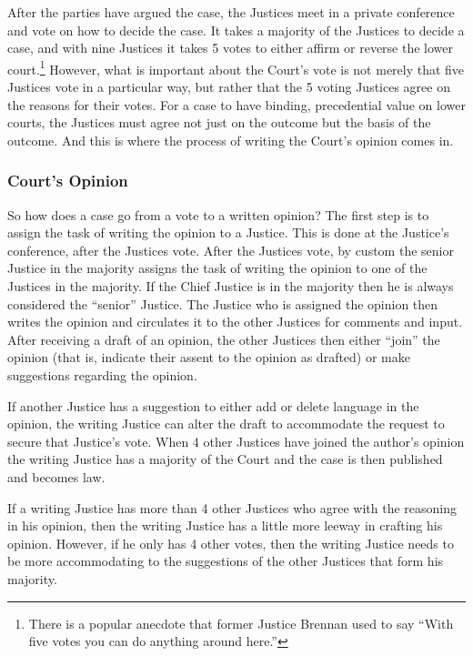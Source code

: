 After the parties have argued the case, the Justices meet in a private conference and vote on how to decide the case.
It takes a majority of the Justices to decide a case, and with nine Justices it takes 5 votes to either affirm or reverse the lower court.\footnote{There is a popular anecdote that former Justice Brennan used to say ``With five votes you can do anything around here.''}  However, what is important about the Court's vote is not merely that five Justices vote in a particular way, but rather that the 5 voting Justices agree on the reasons for their votes.  For a case to have binding, precedential value on lower courts, the Justices must agree not just on the outcome but the basis of the outcome.  And this is where the process of writing the Court's opinion comes in.

\subsubsection{Court's Opinion}
So how does a case go from a vote to a written opinion?  The first step is to assign the task of writing the opinion to a Justice.  This is done at the Justice's conference, after the Justices vote.  After the Justices vote, by custom the senior Justice in the majority assigns the task of writing the opinion to one of the Justices in the majority.  If the Chief Justice is in the majority then he is always considered the ``senior'' Justice.  The Justice who is assigned the opinion then writes the opinion and circulates it to the other Justices for comments and input.  After receiving a draft of an opinion, the other Justices then either ``join'' the opinion (that is, indicate their assent to the opinion as drafted) or make suggestions regarding the opinion.

If another Justice has a suggestion to either add or delete language in the opinion, the writing Justice can alter the draft to accommodate the request to secure that Justice's vote.  When 4 other Justices have joined the author's opinion the writing Justice has a majority of the Court and the case is then published and becomes law.

If a writing Justice has more than 4 other Justices who agree with the reasoning in his opinion, then the writing Justice has a little more leeway in crafting his opinion.  
However, if he only has 4 other votes, then the writing Justice needs to be more accommodating to the suggestions of the other Justices that form his majority.



